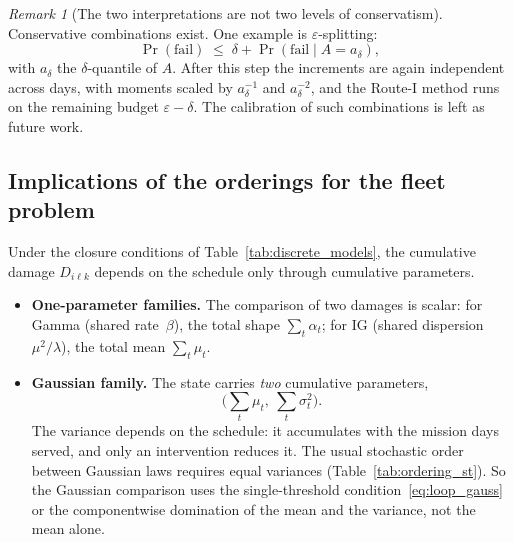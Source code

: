 \documentclass[11pt,a4paper]{article}
\theoremstyle{plain}
\theoremstyle{definition}
\theoremstyle{remark}
\newtheorem{remark}[theorem]{Remark}
\begin{document}
\begin{remark}[The two interpretations are not two levels of conservatism]
Conservative combinations exist.
One example is $\varepsilon$-splitting:
\begin{equation}
  \Pr(\text{fail}) \;\le\; \delta + \Pr(\text{fail} \mid A = a_\delta),
\end{equation}
with $a_\delta$ the $\delta$-quantile of $A$.
After this step the increments are again independent across days, with moments scaled by $a_\delta^{-1}$ and $a_\delta^{-2}$, and the Route-I method runs on the remaining budget $\varepsilon - \delta$.
The calibration of such combinations is left as future work.
\end{remark}

\subsection{Implications of the orderings for the fleet problem}
Under the closure conditions of Table~\ref{tab:discrete_models}, the cumulative damage $D_{i\ell k}$ depends on the schedule only through cumulative parameters.
\begin{itemize}
  \item \textbf{One-parameter families.} The comparison of two damages is scalar:
    for Gamma (shared rate~$\beta$), the total shape $\sum_t \alpha_t$;
    for IG (shared dispersion $\mu^2/\lambda$), the total mean $\sum_t \mu_t$.
  \item \textbf{Gaussian family.} The state carries \emph{two} cumulative parameters,
    \begin{equation}
      \bigl(\sum_t \mu_t,\ \sum_t \sigma_t^2\bigr).
    \end{equation}
    The variance depends on the schedule: it accumulates with the mission days served, and only an intervention reduces it.
    The usual stochastic order between Gaussian laws requires equal variances (Table~\ref{tab:ordering_st}).
    So the Gaussian comparison uses the single-threshold condition~\eqref{eq:loop_gauss} or the componentwise domination of the mean and the variance, not the mean alone.
\end{itemize}
\end{document}
